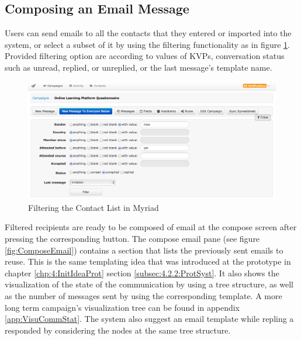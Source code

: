 \clearpage

\subsection{Composing an Email Message}
\label{subsec:5.2.4:CompEmaiMess}

Users can send emails to all the contacts that they entered or imported into the system, or select a subset of it by using the filtering functionality as in figure \ref{fig:ContactFilters}. Provided filtering option are according to values of \ac{KVP}s, conversation status such as unread, replied, or unreplied, or the last message's template name.

\begin{figure}[htbp]
	\centering
	\includegraphics[width=1.00\textwidth]{imgs/ContactFilters.png}
	\caption[Filtering the Contact List in Myriad]{Filtering the Contact List in Myriad}
	\label{fig:ContactFilters}
\end{figure}

Filtered recipients are ready to be composed of email at the compose screen after pressing the corresponding button. The compose email pane (see figure \ref{fig:ComposeEmail}) contains a section that lists the previously sent emails to reuse. This is the same templating idea that was introduced at the prototype in chapter \ref{chp:4:InitIdeaProt} section \ref{subsec:4.2.2:ProtSyst}. It also shows the visualization of the state of the communication by using a tree structure, as well as the number of messages sent by using the corresponding template. A more long term campaign's visualization tree can be found in appendix \ref{app:VisuCommStat}. The system also suggest an email template while repling a responded by considering the nodes at the same tree structure.

